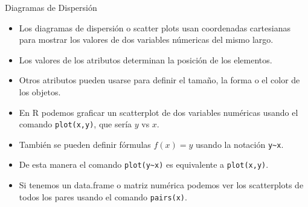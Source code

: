\documentclass[handout]{beamer}
\begin{document}
\begin{frame}[fragile]{Diagramas de Dispersión}
\scriptsize{
\begin{itemize}
 \item Los diagramas de dispersión o scatter plots usan coordenadas cartesianas para mostrar los valores de dos variables númericas del mismo largo.
 \item Los valores de los atributos determinan la posición de los elementos.
 \item Otros atributos pueden usarse para definir el tamaño, la forma o el color de los objetos.
 
  \item En R podemos graficar un scatterplot de dos variables numéricas usando el comando \verb+plot(x,y)+, que sería $y$ vs $x$.
  \item También se pueden definir fórmulas $f(x)=y$  usando la notación \verb+y~x+. 
  
 \item De esta manera el comando \verb+plot(y~x)+ es equivalente a \verb+plot(x,y)+.
 
 \item Si tenemos un data.frame o matriz numérica podemos ver los scatterplots de todos los pares usando el comando \verb+pairs(x)+.
  
 
 
\end{itemize}




}
 
\end{frame}
\end{document}
